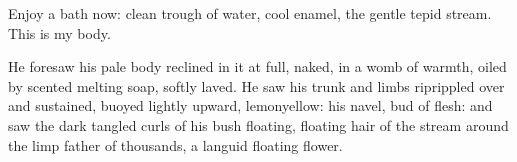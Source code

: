 Enjoy a bath now:
clean trough of water,
cool enamel,
the gentle tepid stream.
This is my body.

He foresaw his pale body reclined in it at full,
naked,
in a womb of warmth,
oiled by scented melting soap,
softly laved.
He saw his trunk and limbs riprippled over
and sustained,
buoyed lightly upward,
lemonyellow:
his navel, bud of flesh:
and saw the dark tangled curls of his bush
floating,
floating hair of the stream
around the limp father of thousands,
a languid floating flower.


